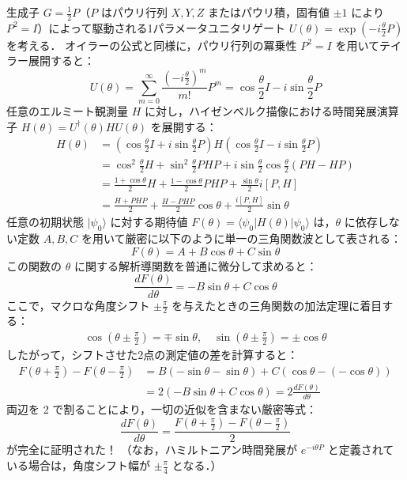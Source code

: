 \documentclass[11pt,a4paper,oneside,openany]{ltjsbook}
\theoremstyle{definition}
\theoremstyle{plain}
\theoremstyle{remark}
\newcommand{\ket}[1]{|#1\rangle}
\newcommand{\mel}[3]{\langle#1|#2|#3\rangle}
\begin{document}
\begin{insightbox}
生成子 $G = \frac{1}{2} P$（$P$ はパウリ行列 $X, Y, Z$ またはパウリ積，固有値 $\pm 1$ により $P^2 = I$）によって駆動される1パラメータユニタリゲート $U(\theta) = \exp(-i \frac{\theta}{2} P)$ を考える．
オイラーの公式と同様に，パウリ行列の冪乗性 $P^2 = I$ を用いてテイラー展開すると：
\begin{equation}
    U(\theta) = \sum_{m=0}^\infty \frac{(-i \frac{\theta}{2})^m}{m!} P^m = \cos\frac{\theta}{2} I - i \sin\frac{\theta}{2} P
\end{equation}
任意のエルミート観測量 $H$ に対し，ハイゼンベルク描像における時間発展演算子 $H(\theta) = U^\dagger(\theta) H U(\theta)$ を展開する：
\begin{align}
    H(\theta) &= \left( \cos\frac{\theta}{2} I + i \sin\frac{\theta}{2} P \right) H \left( \cos\frac{\theta}{2} I - i \sin\frac{\theta}{2} P \right) \nonumber \\
    &= \cos^2\frac{\theta}{2} H + \sin^2\frac{\theta}{2} P H P + i \sin\frac{\theta}{2}\cos\frac{\theta}{2} (P H - H P) \nonumber \\
    &= \frac{1 + \cos\theta}{2} H + \frac{1 - \cos\theta}{2} P H P + \frac{\sin\theta}{2} i [P, H] \nonumber \\
    &= \frac{H + P H P}{2} + \frac{H - P H P}{2} \cos\theta + \frac{i[P, H]}{2} \sin\theta
\end{align}
任意の初期状態 $\ket{\psi_0}$ に対する期待値 $F(\theta) = \mel{\psi_0}{H(\theta)}{\psi_0}$ は，$\theta$ に依存しない定数 $A, B, C$ を用いて厳密に以下のように単一の三角関数波として表される：
\begin{equation}
    F(\theta) = A + B \cos\theta + C \sin\theta
\end{equation}
この関数の $\theta$ に関する解析導関数を普通に微分して求めると：
\begin{equation}
    \frac{d F(\theta)}{d \theta} = -B \sin\theta + C \cos\theta
\end{equation}
ここで，マクロな角度シフト $\pm \frac{\pi}{2}$ を与えたときの三角関数の加法定理に着目する：
\begin{align}
    \cos\left(\theta \pm \frac{\pi}{2}\right) = \mp \sin\theta, \quad \sin\left(\theta \pm \frac{\pi}{2}\right) = \pm \cos\theta
\end{align}
したがって，シフトさせた2点の測定値の差を計算すると：
\begin{align}
    F\left(\theta + \frac{\pi}{2}\right) - F\left(\theta - \frac{\pi}{2}\right) &= B (-\sin\theta - \sin\theta) + C (\cos\theta - (-\cos\theta)) \nonumber \\
    &= 2 \left( -B \sin\theta + C \cos\theta \right) = 2 \frac{d F(\theta)}{d \theta}
\end{align}
両辺を 2 で割ることにより，一切の近似を含まない厳密等式：
\begin{equation}
    \frac{d F(\theta)}{d \theta} = \frac{F\left(\theta + \frac{\pi}{2}\right) - F\left(\theta - \frac{\pi}{2}\right)}{2}
\end{equation}
が完全に証明された！ （なお，ハミルトニアン時間発展が $e^{-i\theta P}$ と定義されている場合は，角度シフト幅が $\pm \frac{\pi}{4}$ となる．）
\end{insightbox}
\end{document}
